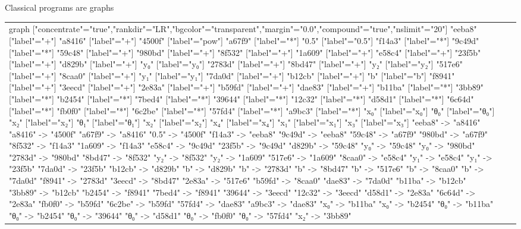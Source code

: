 \documentclass{beamer}
\begin{document}
\begin{frame}[fragile]{Classical programs are graphs}
\begin{table}[H]
\begin{tabular}{lcc}
\begin{adjustbox}{minipage={.25\textwidth}, height=0.14\textwidth, margin*=0cm 0cm 0cm 0.1cm}
{    graph ["concentrate"="true","rankdir"="LR","bgcolor"="transparent","margin"="0.0","compound"="true","nslimit"="20"]
    "eeba8" ["label"="+"]
    "a8416" ["label"="+"]
    "4500f" ["label"="pow"]
    "a67f9" ["label"="*"]
    "0.5" ["label"="0.5"]
    "f14a3" ["label"="*"]
    "9c49d" ["label"="*"]
    "59c48" ["label"="+"]
    "980bd" ["label"="+"]
    "8f532" ["label"="+"]
    "1a609" ["label"="+"]
    "e58c4" ["label"="+"]
    "23f5b" ["label"="+"]
    "d829b" ["label"="+"]
    "y₀" ["label"="y₀"]
    "2783d" ["label"="+"]
    "8bd47" ["label"="+"]
    "y₂" ["label"="y₂"]
    "517e6" ["label"="+"]
    "8caa0" ["label"="+"]
    "y₁" ["label"="y₁"]
    "7da0d" ["label"="+"]
    "b12cb" ["label"="+"]
    "b" ["label"="b"]
    "f8941" ["label"="+"]
    "3eecd" ["label"="+"]
    "2e83a" ["label"="+"]
    "b59fd" ["label"="+"]
    "dae83" ["label"="+"]
    "b11ba" ["label"="*"]
    "3bb89" ["label"="*"]
    "b2454" ["label"="*"]
    "7bed4" ["label"="*"]
    "39644" ["label"="*"]
    "12c32" ["label"="*"]
    "d58d1" ["label"="*"]
    "6c64d" ["label"="*"]
    "fb0f0" ["label"="*"]
    "6c2be" ["label"="*"]
    "57fd4" ["label"="*"]
    "a9bc3" ["label"="*"]
    "x₀" ["label"="x₀"]
    "θ₀" ["label"="θ₀"]
    "x₂" ["label"="x₂"]
    "θ₁" ["label"="θ₁"]
    "x₂" ["label"="x₂"]
    "x₄" ["label"="x₄"]
    "x₁" ["label"="x₁"]
    "x₃" ["label"="x₃"]
    "eeba8" -> "a8416"
    "a8416" -> "4500f"
    "a67f9" -> "a8416"
    "0.5" -> "4500f"
    "f14a3" -> "eeba8"
    "9c49d" -> "eeba8"
    "59c48" -> "a67f9"
    "980bd" -> "a67f9"
    "8f532" -> "f14a3"
    "1a609" -> "f14a3"
    "e58c4" -> "9c49d"
    "23f5b" -> "9c49d"
    "d829b" -> "59c48"
    "y₀" -> "59c48"
    "y₀" -> "980bd"
    "2783d" -> "980bd"
    "8bd47" -> "8f532"
    "y₂" -> "8f532"
    "y₂" -> "1a609"
    "517e6" -> "1a609"
    "8caa0" -> "e58c4"
    "y₁" -> "e58c4"
    "y₁" -> "23f5b"
    "7da0d" -> "23f5b"
    "b12cb" -> "d829b"
    "b" -> "d829b"
    "b" -> "2783d"
    "b" -> "8bd47"
    "b" -> "517e6"
    "b" -> "8caa0"
    "b" -> "7da0d"
    "f8941" -> "2783d"
    "3eecd" -> "8bd47"
    "2e83a" -> "517e6"
    "b59fd" -> "8caa0"
    "dae83" -> "7da0d"
    "b11ba" -> "b12cb"
    "3bb89" -> "b12cb"
    "b2454" -> "f8941"
    "7bed4" -> "f8941"
    "39644" -> "3eecd"
    "12c32" -> "3eecd"
    "d58d1" -> "2e83a"
    "6c64d" -> "2e83a"
    "fb0f0" -> "b59fd"
    "6c2be" -> "b59fd"
    "57fd4" -> "dae83"
    "a9bc3" -> "dae83"
    "x₀" -> "b11ba"
    "x₀" -> "b2454"
    "θ₀" -> "b11ba"
    "θ₀" -> "b2454"
    "θ₀" -> "39644"
    "θ₀" -> "d58d1"
    "θ₀" -> "fb0f0"
    "θ₀" -> "57fd4"
    "x₂" -> "3bb89"
}
\end{adjustbox}
\end{tabular}
\end{table}
\end{frame}
\end{document}
